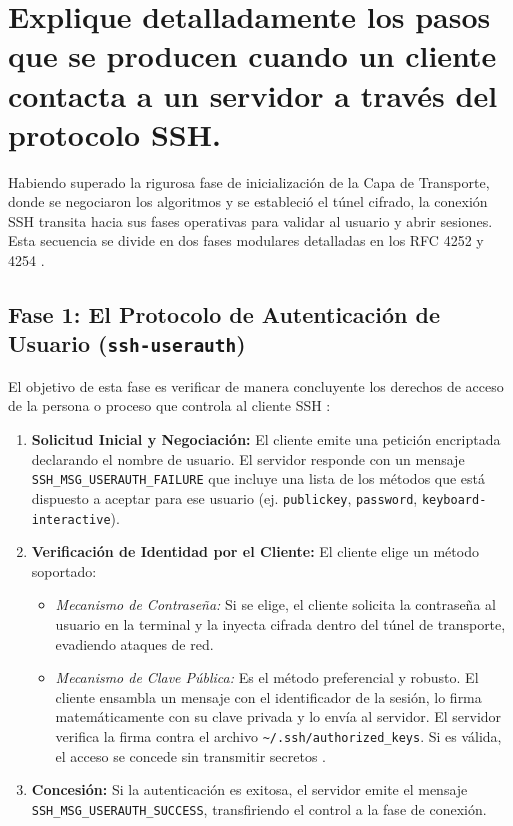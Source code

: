\documentclass[a4paper,12pt]{article}
\begin{document}
\section{Explique detalladamente los pasos que se producen cuando un cliente contacta a un servidor a través del protocolo SSH.}

Habiendo superado la rigurosa fase de inicialización de la Capa de Transporte, donde se negociaron los algoritmos y se estableció el túnel cifrado, la conexión SSH transita hacia sus fases operativas para validar al usuario y abrir sesiones. Esta secuencia se divide en dos fases modulares detalladas en los RFC 4252 y 4254 \cite{rfc4252_ietf, rfc4254_ietf}.

\subsection*{Fase 1: El Protocolo de Autenticación de Usuario (\texttt{ssh-userauth})}
El objetivo de esta fase es verificar de manera concluyente los derechos de acceso de la persona o proceso que controla al cliente SSH \cite{rfc4252_ietf}:
\begin{enumerate}
    \item \textbf{Solicitud Inicial y Negociación:} El cliente emite una petición encriptada declarando el nombre de usuario. El servidor responde con un mensaje \texttt{SSH\_MSG\_USERAUTH\_FAILURE} que incluye una lista de los métodos que está dispuesto a aceptar para ese usuario (ej. \texttt{publickey}, \texttt{password}, \texttt{keyboard-interactive}).
    \item \textbf{Verificación de Identidad por el Cliente:} El cliente elige un método soportado:
    \begin{itemize}
        \item \textit{Mecanismo de Contraseña:} Si se elige, el cliente solicita la contraseña al usuario en la terminal y la inyecta cifrada dentro del túnel de transporte, evadiendo ataques de red.
        \item \textit{Mecanismo de Clave Pública:} Es el método preferencial y robusto. El cliente ensambla un mensaje con el identificador de la sesión, lo firma matemáticamente con su clave privada y lo envía al servidor. El servidor verifica la firma contra el archivo \texttt{\textasciitilde{}/.ssh/authorized\_keys}. Si es válida, el acceso se concede sin transmitir secretos \cite{redhat_legacy_ssh}.
    \end{itemize}
    \item \textbf{Concesión:} Si la autenticación es exitosa, el servidor emite el mensaje \texttt{SSH\_MSG\_USERAUTH\_SUCCESS}, transfiriendo el control a la fase de conexión.
\end{enumerate}
\end{document}
